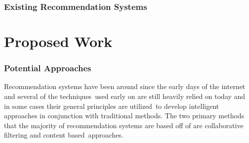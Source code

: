 \documentclass[letterpaper,12pt]{article}
\begin{document}
\subsection{Existing Recommendation Systems}

\chapter{Proposed Work}

\subsection{Potential Approaches}
Recommendation systems have been around since the early days of the internet and several of the techniques\
used early on are still heavily relied on today and in some cases their general principles are utilized\
to develop intelligent approaches in conjunction with traditional methods. The two primary methods that
the majority of recommendation systems are based off of are collaborative filtering and content based\
approaches. \cite{portugal2018use}
\end{document}
